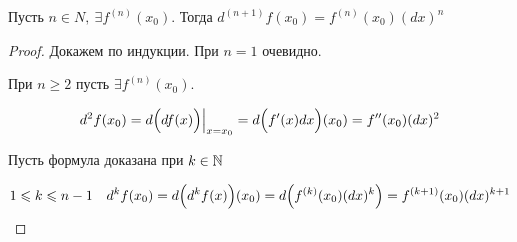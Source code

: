 \begin{theorem}
    Пусть $n\in N, \ \exists f^{(n)}(x_{0})$. Тогда  $d^{(n+1)} f(x_{0}) = f^{(n)}(x_{0}) (dx)^{n}$ 
\end{theorem}
\begin{proof}
    Докажем по индукции. При $n = 1$ очевидно.

    При $n \geq 2$ пусть $\exists f^{(n)}(x_{0})$.

    $$
    d^{2} f(x_{0}) = d\Bigl(df(x)\Bigr) \Bigr|_{x = x_{0}} = d\Bigl(f'(x)dx\Bigr)(x_{0}) = f''(x_{0})(dx)^{2}
    $$

    Пусть формула доказана при $k \in \N$

    $$
    1 \leq k\leq n-1 \quad d^{k} f(x_{0}) = d\Bigl(d^{k} f(x)\Bigr)(x_{0}) = d\Bigl(f^{(k)}(x_{0}) (dx)^{k}\Bigr) = f^{(k +1)}(x_{0})(dx)^{k+1}
    $$
    
\end{proof}